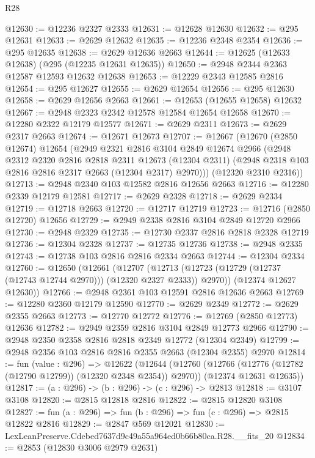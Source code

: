 \begin{lexlean}{R28}
\begin{coremodule}
@12630 := @12236 @2327 @2333
@12631 := @12628 @12630
@12632 := @295 @12631
@12633 := @2629 @12632
@12635 := @12236 @2348 @2354
@12636 := @295 @12635
@12638 := @2629 @12636 @2663
@12644 := @12625 (@12633 @12638) (@295 (@12235 @12631 @12635))
@12650 := @2948 @2344 @2363 @12587 @12593 @12632 @12638
@12653 := @12229 @2343 @12585 @2816
@12654 := @295 @12627
@12655 := @2629 @12654
@12656 := @295 @12630
@12658 := @2629 @12656 @2663
@12661 := @12653 (@12655 @12658) @12632
@12667 := @2948 @2323 @2342 @12578 @12584 @12654 @12658
@12670 := @12280 @2322 @12179 @12577
@12671 := @2629 @2311
@12673 := @2629 @2317 @2663
@12674 := @12671 @12673
@12707 := @12667
    (@12670
      (@2850 @12674)
      @12654
      (@2949
        @2321
        @2816
        @3104
        @2849
        @12674
        @2966
        (@2948
          @2312
          @2320
          @2816
          @2818
          @2311
          @12673
          (@12304 @2311)
          (@2948 @2318 @103 @2816 @2816 @2317 @2663 (@12304 @2317) @2970)))
      (@12320 @2310 @2316))
@12713 := @2948 @2340 @103 @12582 @2816 @12656 @2663
@12716 := @12280 @2339 @12179 @12581
@12717 := @2629 @2328
@12718 := @2629 @2334
@12719 := @12718 @2663
@12720 := @12717 @12719
@12723 := @12716 (@2850 @12720) @12656
@12729 := @2949 @2338 @2816 @3104 @2849 @12720 @2966
@12730 := @2948 @2329
@12735 := @12730 @2337 @2816 @2818 @2328 @12719
@12736 := @12304 @2328
@12737 := @12735 @12736
@12738 := @2948 @2335
@12743 := @12738 @103 @2816 @2816 @2334 @2663
@12744 := @12304 @2334
@12760 := @12650
    (@12661
      (@12707 (@12713 (@12723 (@12729 (@12737 (@12743 @12744 @2970))) (@12320 @2327 @2333)) @2970))
      (@12374 @12627 @12630))
@12766 := @2948 @2361 @103 @12591 @2816 @12636 @2663
@12769 := @12280 @2360 @12179 @12590
@12770 := @2629 @2349
@12772 := @2629 @2355 @2663
@12773 := @12770 @12772
@12776 := @12769 (@2850 @12773) @12636
@12782 := @2949 @2359 @2816 @3104 @2849 @12773 @2966
@12790 := @2948 @2350 @2358 @2816 @2818 @2349 @12772 (@12304 @2349)
@12799 := @2948 @2356 @103 @2816 @2816 @2355 @2663 (@12304 @2355) @2970
@12814 := fun (value : @296) =>
  @12622
    (@12644
      (@12760 (@12766 (@12776 (@12782 (@12790 @12799)) (@12320 @2348 @2354)) @2970))
      (@12374 @12631 @12635))
@12817 := (a : @296) -> (b : @296) -> (c : @296) -> @2813
@12818 := @3107 @3108
@12820 := @2815 @12818 @2816
@12822 := @2815 @12820 @3108
@12827 := fun (a : @296) => fun (b : @296) => fun (c : @296) => @2815 @12822 @2816
@12829 := @2847 @569 @12021
@12830 := LexLeanPreserve.Cdebed7637d9c49a55a964ed0b66b80ca.R28.__fits_20
@12834 := @2853 (@12830 @3006 @2979 @2631)

\end{coremodule}
\end{lexlean}
